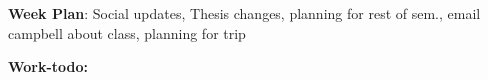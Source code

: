\documentclass[11pt]{article}
\begin{document}



\textbf{Week Plan}: Social updates, Thesis changes, planning for rest
of sem., email campbell about class, planning for trip


\textbf{Work-todo:}\\
\end{document}

